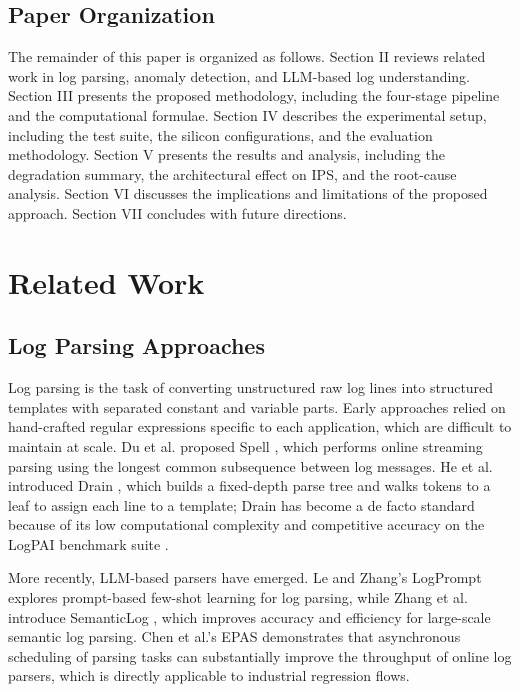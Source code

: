 \documentclass[conference]{IEEEtran}
\begin{document}
\subsection{Paper Organization}
The remainder of this paper is organized as follows. Section II reviews related work in log parsing, anomaly detection, and LLM-based log understanding. Section III presents the proposed methodology, including the four-stage pipeline and the computational formulae. Section IV describes the experimental setup, including the test suite, the silicon configurations, and the evaluation methodology. Section V presents the results and analysis, including the degradation summary, the architectural effect on IPS, and the root-cause analysis. Section VI discusses the implications and limitations of the proposed approach. Section VII concludes with future directions.

\section{Related Work}

\subsection{Log Parsing Approaches}
Log parsing is the task of converting unstructured raw log lines into structured templates with separated constant and variable parts. Early approaches relied on hand-crafted regular expressions specific to each application, which are difficult to maintain at scale. Du et al. proposed Spell \cite{du2016spell}, which performs online streaming parsing using the longest common subsequence between log messages. He et al. introduced Drain \cite{he2017drain}, which builds a fixed-depth parse tree and walks tokens to a leaf to assign each line to a template; Drain has become a de facto standard because of its low computational complexity and competitive accuracy on the LogPAI benchmark suite \cite{zhu2019tools}.

More recently, LLM-based parsers have emerged. Le and Zhang's LogPrompt \cite{le2023logprompt} explores prompt-based few-shot learning for log parsing, while Zhang et al. introduce SemanticLog \cite{zhang2025semanticlog}, which improves accuracy and efficiency for large-scale semantic log parsing. Chen et al.'s EPAS \cite{chen2025epas} demonstrates that asynchronous scheduling of parsing tasks can substantially improve the throughput of online log parsers, which is directly applicable to industrial regression flows.
\end{document}
